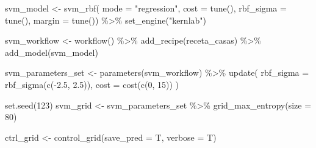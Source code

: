 \documentclass[
]{book}
\newenvironment{Shaded}{\begin{snugshade}}{\end{snugshade}}
\newcommand{\AttributeTok}[1]{\textcolor[rgb]{0.77,0.63,0.00}{#1}}
\newcommand{\DecValTok}[1]{\textcolor[rgb]{0.00,0.00,0.81}{#1}}
\newcommand{\FloatTok}[1]{\textcolor[rgb]{0.00,0.00,0.81}{#1}}
\newcommand{\FunctionTok}[1]{\textcolor[rgb]{0.00,0.00,0.00}{#1}}
\newcommand{\NormalTok}[1]{#1}
\newcommand{\OtherTok}[1]{\textcolor[rgb]{0.56,0.35,0.01}{#1}}
\newcommand{\SpecialCharTok}[1]{\textcolor[rgb]{0.00,0.00,0.00}{#1}}
\newcommand{\StringTok}[1]{\textcolor[rgb]{0.31,0.60,0.02}{#1}}
\begin{document}
\begin{Shaded}
\begin{Highlighting}[]
\NormalTok{svm\_model }\OtherTok{\textless{}{-}} \FunctionTok{svm\_rbf}\NormalTok{(}
  \AttributeTok{mode =} \StringTok{"regression"}\NormalTok{,}
  \AttributeTok{cost =} \FunctionTok{tune}\NormalTok{(),}
  \AttributeTok{rbf\_sigma =} \FunctionTok{tune}\NormalTok{(),}
  \AttributeTok{margin =} \FunctionTok{tune}\NormalTok{()) }\SpecialCharTok{\%\textgreater{}\%} 
\FunctionTok{set\_engine}\NormalTok{(}\StringTok{"kernlab"}\NormalTok{)}

\NormalTok{svm\_workflow }\OtherTok{\textless{}{-}} \FunctionTok{workflow}\NormalTok{() }\SpecialCharTok{\%\textgreater{}\%} 
  \FunctionTok{add\_recipe}\NormalTok{(receta\_casas) }\SpecialCharTok{\%\textgreater{}\%} 
  \FunctionTok{add\_model}\NormalTok{(svm\_model)}

\NormalTok{svm\_parameters\_set }\OtherTok{\textless{}{-}} \FunctionTok{parameters}\NormalTok{(svm\_workflow) }\SpecialCharTok{\%\textgreater{}\%} 
  \FunctionTok{update}\NormalTok{(}
   \AttributeTok{rbf\_sigma =} \FunctionTok{rbf\_sigma}\NormalTok{(}\FunctionTok{c}\NormalTok{(}\SpecialCharTok{{-}}\FloatTok{2.5}\NormalTok{, }\FloatTok{2.5}\NormalTok{)), }
   \AttributeTok{cost =} \FunctionTok{cost}\NormalTok{(}\FunctionTok{c}\NormalTok{(}\DecValTok{0}\NormalTok{, }\DecValTok{15}\NormalTok{))}
\NormalTok{   )}

\FunctionTok{set.seed}\NormalTok{(}\DecValTok{123}\NormalTok{)}
\NormalTok{svm\_grid }\OtherTok{\textless{}{-}}\NormalTok{ svm\_parameters\_set }\SpecialCharTok{\%\textgreater{}\%} 
  \FunctionTok{grid\_max\_entropy}\NormalTok{(}\AttributeTok{size =} \DecValTok{80}\NormalTok{)}

\NormalTok{ctrl\_grid }\OtherTok{\textless{}{-}} \FunctionTok{control\_grid}\NormalTok{(}\AttributeTok{save\_pred =}\NormalTok{ T, }\AttributeTok{verbose =}\NormalTok{ T)}
\end{Highlighting}
\end{Shaded}
\end{document}
